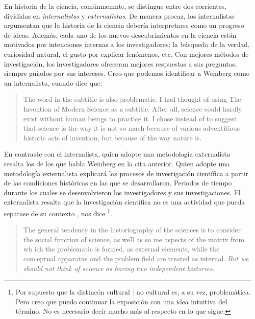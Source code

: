 \noindent En historia de la ciencia, comúnmenmte, se distingue entre dos corrientes, divididas en \emph{internalistas} y \emph{externalistas}.
De manera procaz, los internalistas argumentan que la historia de la ciencia debería interpretarse como un progreso de ideas.
Además, cada uno de los nuevos descubrimientos en la ciencia están motivados por intenciones internas a los investigadores: la búsqueda de la verdad, curiosidad natural, el gusto por explicar fenómenos, etc.
Con mejores métodos de investigación, los investigadores ofreceran mejores respuestas a sus preguntas, siempre guíados por sus intereses.
Creo que podemos identificar a Weinberg como un internalista, cuando dice que:

\begin{quote}
	The word  in the subtitle is also problematic. I had thought of using The Invention of Modern Science as a subtitle. After all, science could hardly exist without human beings to practice it. I chose  instead of  to suggest that science is the way it is not so much because of various adventitious historic acts of invention, but because of the way nature is. \parencite{Weinberg2015}
\end{quote}

En contraste con el internalista, quien adopte una metodología externalista resalta los  de los que habla Weinberg en la cita anterior.
Quien adopte una metodología externalista explicará los procesos de investigación científica a partir de las condiciones históricas en las que se desarrollaron.
Periodos de tiempo durante los cuales se desenvolvieron los investigadores y sus investigaciones.
El externalista resalta que la investigación científica no es una actividad que pueda separase de su contexto , nos dice \textcite{Yturbe1995}\footnote{
	Por supuesto que la distincón cultural $|$ no cultural es, a su vez, problemática.
	Pero creo que puedo continuar la exposición con una idea intuitiva del término.
	No es necesario decir mucho más al respecto en lo que sigue.
}.



\begin{quote}
	The general tendency in the historiography of the sciences is to consider the social function of science, as weIl as so me aspects of the matrix from wh ich the problematic is formed, as external elements, while the conceptual apparatus and the problem field are treated as internal. \emph{But we should not think of science as having two independent histories.} \parencite[][p. 85. Énfasis agregado]{Yturbe1995}
\end{quote}

